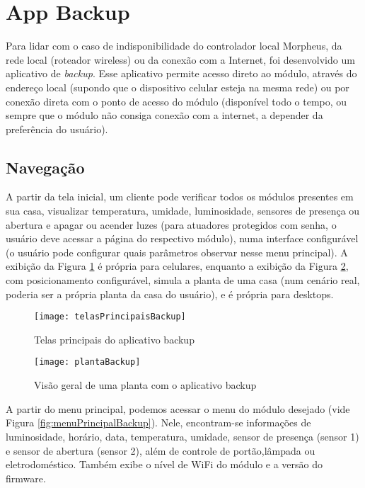 \section{App Backup}

Para lidar com o caso de indisponibilidade do controlador local Morpheus, da rede local (roteador wireless) ou da conexão com a Internet, foi desenvolvido um aplicativo de \textit{backup}. Esse aplicativo permite acesso direto ao módulo, através do endereço local (supondo que o dispositivo celular esteja na mesma rede) ou por conexão direta com o ponto de acesso do módulo (disponível todo o tempo, ou sempre que o módulo não consiga conexão com a internet, a depender da preferência do usuário).

\subsection{Navegação}

A partir da tela inicial, um cliente pode verificar todos os módulos presentes em sua casa, visualizar temperatura, umidade, luminosidade, sensores de presença ou abertura e apagar ou acender luzes (para atuadores protegidos com senha, o usuário deve acessar a página do respectivo módulo), numa interface configurável (o usuário pode configurar quais parâmetros observar nesse menu principal). A exibição da Figura \ref{fig:telasPrincipaisBackup} é própria para celulares, enquanto a exibição da Figura \ref{fig:plantaBackup}, com posicionamento configurável, simula a planta de uma casa (num cenário real, poderia ser a própria planta da casa do usuário), e é própria para desktops.

\begin{figure}[H]
	\centering
	\caption{Telas principais do aplicativo backup}
  \texttt{[image: telasPrincipaisBackup]}
\label{fig:telasPrincipaisBackup}
\end{figure}

\begin{figure}[H]
  \centering
  \caption{Visão geral de uma planta com o aplicativo backup}
  \texttt{[image: plantaBackup]}
  \label{fig:plantaBackup}
\end{figure}

A partir do menu principal, podemos acessar o menu do módulo desejado (vide Figura \ref{fig:menuPrincipalBackup}). Nele, encontram-se informações de luminosidade, horário, data, temperatura, umidade, sensor de presença (sensor 1) e sensor de abertura (sensor 2), além de controle de portão,lâmpada ou eletrodoméstico. Também exibe o nível de WiFi do módulo e a versão do firmware.

